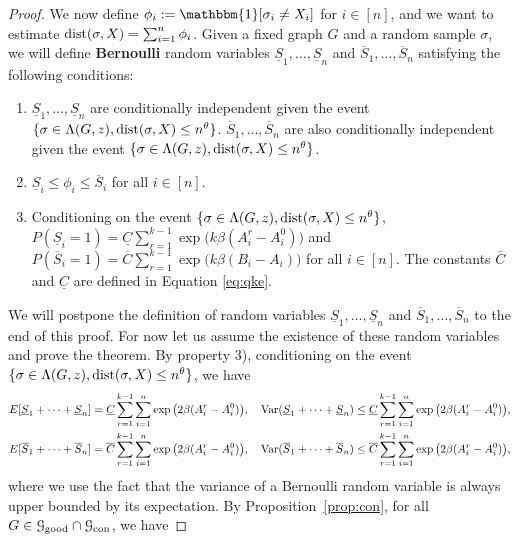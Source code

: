 \documentclass{article}
\begin{document}
\begin{proof}
	We now define 
	$\phi_i := \mathbbm{1}[\sigma_i \neq X_i]$ for $i\in[n]$, and
	we want to estimate $\operatorname{dist}(\sigma,X)=\sum_{i=1}^n \phi_i$. 
	Given a fixed graph $G$ and a random sample $\sigma$, we will define {\bf Bernoulli} random variables $\underline{S}_1,\dots, \underline{S}_n$ and $\overline{S}_1,\dots,\overline{S}_n$ satisfying the following conditions:
	\begin{enumerate}
		\item $\underline{S}_1,\dots, \underline{S}_n$ are conditionally independent given the event $\{\sigma\in \Lambda(G,z) ,\operatorname{dist}(\sigma, X) \le n^{\theta}\}$. $\overline{S}_1,\dots,\overline{S}_n$ are also conditionally independent given the event $\{\sigma\in \Lambda(G,z) ,\operatorname{dist}(\sigma, X) \le n^{\theta}\}$.
		\item $\underline{S}_i\le \phi_i\le \overline{S}_i$ for all $i\in[n]$.
		\item Conditioning on the event $\{\sigma\in \Lambda(G,z) ,\operatorname{dist}(\sigma, X) \le n^{\theta}\}$, $P(\underline{S}_i=1)=\underline{C}
		\sum_{r=1}^{k-1}\exp\big(k\beta (A^r_i-A^0_i) \big)$ and $P(\overline{S}_i=1)=\overline{C}
		\sum_{r=1}^{k-1}\exp\big(k\beta (B_i-A_i) \big)$ for all $i\in[n]$. The constants $\bar{C}$ and $\underline{C}$ are defined in Equation \eqref{eq:qke}.
	\end{enumerate}
	We will postpone the definition of random variables $\underline{S}_1,\dots, \underline{S}_n$ and $\overline{S}_1,\dots,\overline{S}_n$ to the end of this proof. For now let us assume the existence of these random variables and prove the theorem.
	By property 3), conditioning on the event $\{\sigma\in \Lambda(G,z) ,\operatorname{dist}(\sigma, X) \le n^{\theta}\}$, we have
	\begin{align*}
	& E[\underline{S}_1 + \dots + \underline{S}_n] = \underline{C}
	\sum_{r=1}^{k-1}\sum_{i=1}^n \exp\big(2\beta (A^r_i-A^0_i) \big) , \quad
	\operatorname{Var}(\underline{S}_1 + \dots + \underline{S}_n) \le \underline{C}
	\sum_{r=1}^{k-1}\sum_{i=1}^n \exp\big(2\beta (A^r_i-A^0_i) \big)
 	, \\
	& E[\overline{S}_1 + \dots + \overline{S}_n] = \overline{C}
	\sum_{r=1}^{k-1}\sum_{i=1}^n \exp\big(2\beta (A^r_i-A^0_i) \big) , \quad
	\operatorname{Var}(\overline{S}_1 + \dots + \overline{S}_n) \le \overline{C}
	\sum_{r=1}^{k-1}\sum_{i=1}^n \exp\big(2\beta (A^r_i-A^0_i) \big) ,
	\end{align*}
	where we use the fact that the variance of a Bernoulli random variable is always upper bounded by its expectation.
	By Proposition~\ref{prop:con}, for all $G\in\mathcal{G}_{\operatorname{good}}\cap\mathcal{G}_{\operatorname{con}}$, we have 

\end{proof}
\end{document}
